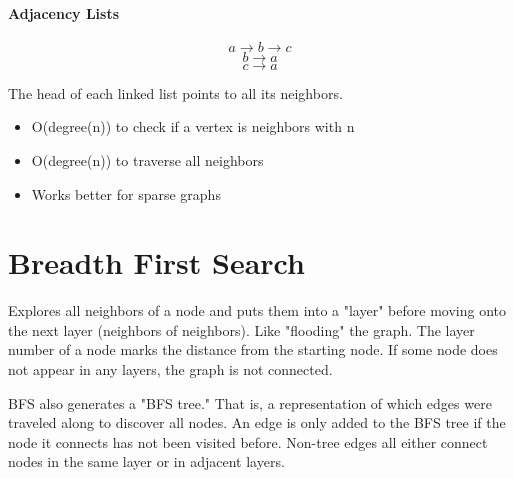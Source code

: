 \paragraph{Adjacency Lists}

\[a \rightarrow b \rightarrow c\]
\[b \rightarrow a \]
\[c \rightarrow a\]

The head of each linked list points to all its neighbors.

\begin{itemize}
    \item O(degree(n)) to check if a vertex is neighbors with n
    \item O(degree(n)) to traverse all neighbors
    \item Works better for sparse graphs
\end{itemize}

\section{Breadth First Search}
Explores all neighbors of a node and puts them into a "layer" before moving onto the next layer (neighbors of neighbors). Like "flooding" the graph. The layer number of a node marks the distance from the starting node. If some node does not appear in any layers, the graph is not connected.

BFS also generates a "BFS tree." That is, a representation of which edges were traveled along to discover all nodes. An edge is only added to the BFS tree if the node it connects has not been visited before. Non-tree edges all either connect nodes in the same layer or in adjacent layers.

